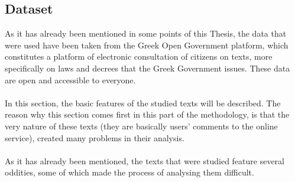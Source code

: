 \subsection{Dataset} \label{311_ref}
As it has already been mentioned in some points of this Thesis, the data that were used have been taken from the Greek Open Government platform, which constitutes a platform of electronic consultation of citizens on texts, more specifically on laws and decrees that the Greek Government issues. These data are open and accessible to everyone.\\
\\
In this section, the basic features of the studied texts will be described. The reason why this section comes first in this part of the methodology, is that the very nature of these texts (they are basically users' comments to the online service), created many problems in their analysis.\\
\\
As it has already been mentioned, the texts that were studied feature several oddities, some of which made the process of analysing them difficult.\\

